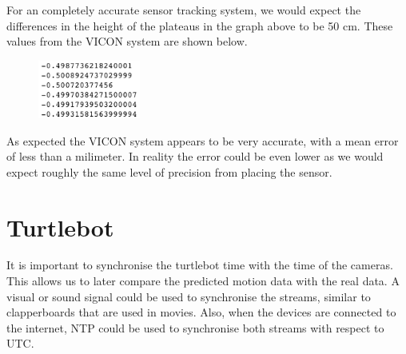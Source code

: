 \documentclass{article}
\begin{document}
For an completely accurate sensor tracking system, we would expect the differences in the height of the plateaus in the graph above to be 50 cm. These values from the VICON system are shown below.

\begin{figure}[H]
  \centering
  \includegraphics[width=0.3\textwidth]{../figures/distdiff.png}
\end{figure}

As expected the VICON system appears to be very accurate, with a mean error of less than a milimeter. In reality the error could be even lower as we would expect roughly the same level of precision from placing the sensor.

\section{Turtlebot}
It is important to synchronise the turtlebot time with the time of the cameras. This allows us to later compare the predicted motion data with the real data. A visual or sound signal could be used to synchronise the streams, similar to clapperboards that are used in movies. Also, when the devices are connected to the internet, NTP could be used to synchronise both streams with respect to UTC.
\end{document}
